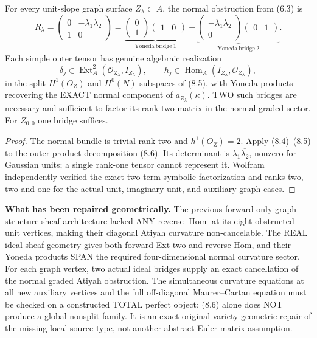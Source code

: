 \documentclass[11pt,a4paper]{article}
\begin{document}
\begin{corollary}
For every unit-slope
graph surface
\(Z_\lambda\subset A\),
the normal obstruction
from (6.3) is
\[
 \boxed{
 R_\lambda=
 \begin{pmatrix}
 0&-\lambda_1\overline{\lambda_2}\\
 1&0
 \end{pmatrix}
 =
 \underbrace{
 \begin{pmatrix}0\\1\end{pmatrix}
        \begin{pmatrix}1&0\end{pmatrix}
        }_{\mathrm{Yoneda\ bridge\ 1}}
 +
 \underbrace{
 \begin{pmatrix}
       -\lambda_1\overline{\lambda_2}\\0
 \end{pmatrix}
        \begin{pmatrix}0&1\end{pmatrix}
        }_{\mathrm{Yoneda\ bridge\ 2}} .
 }                                                       \tag{8.6}
\]
Each simple outer tensor
has genuine algebraic
realization
\[
 \delta_j\in
 \operatorname{Ext}^2_A
       (\mathcal O_{Z_\lambda},I_{Z_\lambda}),
 \qquad
 h_j\in
 \operatorname{Hom}_A
       (I_{Z_\lambda},\mathcal O_{Z_\lambda}),
\]
in the split \(H^1(O_Z)\)
and \(H^0(N)\)
subspaces of (8.5),
with Yoneda products
recovering the EXACT
normal component of
\(a_{Z_\lambda}(\kappa)\).
TWO such bridges are
necessary and sufficient
to factor its rank-two
matrix in the normal
graded sector.
For \(Z_{0,0}\) one
bridge suffices.
\end{corollary}
\begin{proof}
The normal bundle is
trivial rank two and
\(h^1(O_Z)=2\).
Apply (8.4)--(8.5)
to the outer-product
decomposition (8.6).
Its determinant is
\(\lambda_1\overline{\lambda_2}\),
nonzero for Gaussian
units; a single
rank-one tensor cannot
represent it.
Wolfram independently
verified the exact
two-term symbolic
factorization and
ranks two, two and
one for the actual
unit, imaginary-unit,
and auxiliary graph
cases.
\end{proof}

\noindent\textbf{What has been repaired geometrically.}
The previous forward-only
graph-structure-sheaf
architecture lacked
ANY reverse
\(\operatorname{Hom}\)
at its eight obstructed
unit vertices, making
their diagonal Atiyah
curvature non-cancelable.
The REAL ideal-sheaf
geometry gives both
forward Ext-two and
reverse Hom, and
their Yoneda products
SPAN the required
four-dimensional normal
curvature sector.
For each graph vertex,
two actual ideal bridges
supply an exact
cancellation of the
normal graded
Atiyah obstruction.
The simultaneous
curvature equations at
all new auxiliary
vertices and the
full off-diagonal
Maurer--Cartan
equation must be
checked on a constructed
TOTAL perfect object;
(8.6) alone does NOT
produce a global
nonsplit family.
It is an exact
original-variety
geometric repair of
the missing local
source type, not
another abstract
Euler matrix
assumption.
\end{document}
